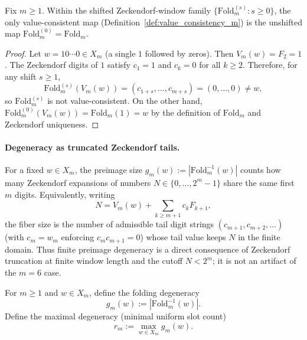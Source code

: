 \begin{proposition}
\label{prop:value_consistency_forbids_shift}
Fix $m\ge 1$.
Within the shifted Zeckendorf-window family $\{\mathrm{Fold}_m^{(s)}:s\ge 0\}$,
the only value-consistent map (Definition~\ref{def:value_consistency_m}) is the
unshifted map $\mathrm{Fold}_m^{(0)}=\mathrm{Fold}_m$.
\end{proposition}
\begin{proof}
Let $w=10\cdots 0\in X_m$ (a single $1$ followed by zeros).
Then $V_m(w)=F_2=1$.
The Zeckendorf digits of $1$ satisfy $c_1=1$ and $c_k=0$ for all $k\ge 2$.
Therefore, for any shift $s\ge 1$,
\[
\mathrm{Fold}_m^{(s)}(V_m(w))=(c_{1+s},\ldots,c_{m+s})=(0,\ldots,0)\neq w,
\]
so $\mathrm{Fold}_m^{(s)}$ is not value-consistent.
On the other hand, $\mathrm{Fold}_m^{(0)}(V_m(w))=\mathrm{Fold}_m(1)=w$ by the
definition of $\mathrm{Fold}_m$ and Zeckendorf uniqueness.
\end{proof}

\paragraph{Degeneracy as truncated Zeckendorf tails.}
For a fixed $w\in X_m$, the preimage size $g_m(w):=|\mathrm{Fold}_m^{-1}(w)|$ counts how many Zeckendorf expansions of numbers $N\in\{0,\dots,2^m-1\}$ share the same first $m$ digits.
Equivalently, writing
\[
N=V_m(w)+\sum_{k\ge m+1} c_k F_{k+1},
\]
the fiber size is the number of admissible tail digit strings $(c_{m+1},c_{m+2},\dots)$ (with $c_m=w_m$ enforcing $c_m c_{m+1}=0$) whose tail value keeps $N$ in the finite domain.
Thus finite preimage degeneracy is a direct consequence of Zeckendorf truncation at finite window length and the cutoff $N<2^m$; it is not an artifact of the $m=6$ case.

\begin{definition}\label{def:rm_max_degeneracy}
\MathTag For $m\ge 1$ and $w\in X_m$, define the folding degeneracy
\[
g_m(w):=\left|\mathrm{Fold}_m^{-1}(w)\right|.
\]
Define the maximal degeneracy (minimal uniform slot count)
\[
r_m:=\max_{w\in X_m} g_m(w).
\]
\end{definition}

